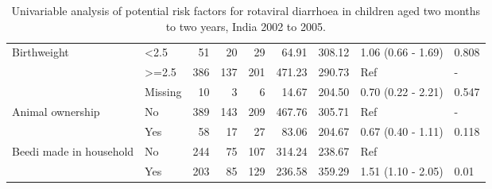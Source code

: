 \documentclass[11pt,a4paper]{article}\usepackage{graphicx, color}
\begin{document}
\begin{sidewaystable}[ht]
{\begin{tabular}{llrrrrrll}
  Birthweight & <2.5 & 51 & 20 & 29 & 64.91 & 308.12 & 1.06 (0.66 - 1.69) & 0.808 \\ 
   & >=2.5 & 386 & 137 & 201 & 471.23 & 290.73 & Ref & - \\ 
   & Missing & 10 & 3 & 6 & 14.67 & 204.50 & 0.70 (0.22 - 2.21) & 0.547 \\ 
  Animal ownership & No & 389 & 143 & 209 & 467.76 & 305.71 & Ref & - \\ 
   & Yes & 58 & 17 & 27 & 83.06 & 204.67 & 0.67 (0.40 - 1.11) & 0.118 \\ 
  Beedi made in household & No & 244 & 75 & 107 & 314.24 & 238.67 & Ref &  \\ 
   & Yes & 203 & 85 & 129 & 236.58 & 359.29 & 1.51 (1.10 - 2.05) & 0.01 \\ 
   \bottomrule
\end{tabular}
}
\caption{Univariable analysis of potential risk factors for rotaviral diarrhoea in children aged two months to two years, India 2002 to 2005.} 
\label{epic}
\end{sidewaystable}
\end{document}

